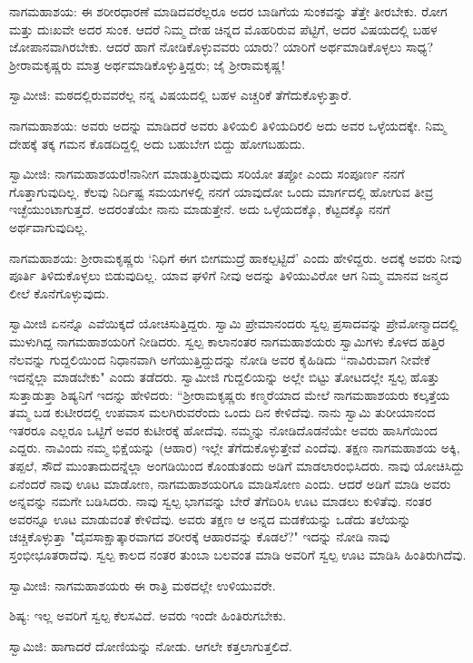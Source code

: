 ನಾಗಮಹಾಶಯ: ಈ ಶರೀರಧಾರಣೆ ಮಾಡಿದವರೆಲ್ಲರೂ ಅದರ ಬಾಡಿಗೆಯ ಸುಂಕವನ್ನು ತೆತ್ತೇ ತೀರಬೇಕು. ರೋಗ ಮತ್ತು ದುಃಖವೇ ಅದರ ಸುಂಕ. ಆದರೆ ನಿಮ್ಮ ದೇಹ ಚಿನ್ನದ ಮೊಹರಿರುವ ಪೆಟ್ಟಿಗೆ, ಅದರ ವಿಷಯದಲ್ಲಿ ಬಹಳ ಜೋಪಾನವಾಗಿರಬೇಕು. ಆದರೆ ಹಾಗೆ ನೋಡಿಕೊಳ್ಳುವವರು ಯಾರು? ಯಾರಿಗೆ ಅರ್ಥಮಾಡಿಕೊಳ್ಳಲು ಸಾಧ್ಯ? ಶ‍್ರೀರಾಮಕೃಷ್ಣರು ಮಾತ್ರ ಅರ್ಥಮಾಡಿಕೊಳ್ಳುತ್ತಿದ್ದರು; ಜೈ ಶ‍್ರೀರಾಮಕೃಷ್ಣ!

ಸ್ವಾಮೀಜಿ: ಮಠದಲ್ಲಿರುವವರೆಲ್ಲ ನನ್ನ ವಿಷಯದಲ್ಲಿ ಬಹಳ ಎಚ್ಚರಿಕೆ ತೆಗೆದುಕೊಳ್ಳುತ್ತಾರೆ.

ನಾಗಮಹಾಶಯ: ಅವರು ಅದನ್ನು ಮಾಡಿದರೆ ಅವರು ತಿಳಿಯಲಿ ತಿಳಿಯದಿರಲಿ ಅದು ಅವರ ಒಳ್ಳೆಯದಕ್ಕೇ. ನಿಮ್ಮ ದೇಹಕ್ಕೆ ತಕ್ಕ ಗಮನ ಕೊಡದಿದ್ದಲ್ಲಿ ಅದು ಬಹುಬೇಗ ಬಿದ್ದು ಹೋಗಬಹುದು.

ಸ್ವಾಮೀಜಿ: ನಾಗಮಹಾಶಯರೆ!ನಾನೀಗ ಮಾಡುತ್ತಿರುವುದು ಸರಿಯೋ ತಪ್ಪೋ ಎಂದು ಸಂಪೂರ್ಣ ನನಗೆ ಗೊತ್ತಾಗುವುದಿಲ್ಲ. ಕೆಲವು ನಿರ್ದಿಷ್ಟ ಸಮಯಗಳಲ್ಲಿ ನನಗೆ ಯಾವುದೋ ಒಂದು ಮಾರ್ಗದಲ್ಲಿ ಹೋಗುವ ತೀವ್ರ ಇಚ್ಛೆಯುಂಟಾಗುತ್ತದೆ. ಅದರಂತೆಯೇ ನಾನು ಮಾಡುತ್ತೇನೆ. ಅದು ಒಳ್ಳೆಯದಕ್ಕೊ, ಕೆಟ್ಟದಕ್ಕೊ ನನಗೆ ಅರ್ಥವಾಗುವುದಿಲ್ಲ.

ನಾಗಮಹಾಶಯ: ಶ‍್ರೀರಾಮಕೃಷ್ಣರು ‘ನಿಧಿಗೆ ಈಗ ಬೀಗಮುದ್ರೆ ಹಾಕಲ್ಪಟ್ಟಿದೆ’ ಎಂದು ಹೇಳಿದ್ದರು. ಅದಕ್ಕೆ ಅವರು ನೀವು ಪೂರ್ತಿ ತಿಳಿದುಕೊಳ್ಳಲು ಬಿಡುವುದಿಲ್ಲ. ಯಾವ ಘಳಿಗೆ ನೀವು ಅದನ್ನು ತಿಳಿಯುವಿರೋ ಆಗ ನಿಮ್ಮ ಮಾನವ ಜನ್ಮದ ಲೀಲೆ ಕೊನೆಗೊಳ್ಳುವುದು.

ಸ್ವಾಮೀಜಿ ಏನನ್ನೊ ಎವೆಯಿಕ್ಕದೆ ಯೋಚಿಸುತ್ತಿದ್ದರು. ಸ್ವಾಮಿ ಪ್ರೇಮಾನಂದರು ಸ್ವಲ್ಪ ಪ್ರಸಾದವನ್ನು ಪ್ರೇಮೋನ್ಮಾದದಲ್ಲಿ ಮುಳುಗಿದ್ದ ನಾಗಮಹಾಶಯರಿಗೆ ನೀಡಿದರು. ಸ್ವಲ್ಪ ಕಾಲಾನಂತರ ನಾಗಮಹಾಶಯರು ಸ್ವಾಮಿಗಳು ಕೊಳದ ಹತ್ತಿರ ನೆಲವನ್ನು ಗುದ್ದಲಿಯಿಂದ ನಿಧಾನವಾಗಿ ಅಗೆಯುತ್ತಿದ್ದುದನ್ನು ನೋಡಿ ಅವರ ಕೈಹಿಡಿದು “ನಾವಿರುವಾಗ ನೀವೇಕೆ ಇದನ್ನೆಲ್ಲಾ ಮಾಡಬೇಕು" ಎಂದು ತಡೆದರು. ಸ್ವಾಮೀಜಿ ಗುದ್ದಲಿಯನ್ನು ಅಲ್ಲೇ ಬಿಟ್ಟು ತೋಟದಲ್ಲೇ ಸ್ವಲ್ಪ ಹೊತ್ತು ಸುತ್ತಾಡುತ್ತಾ ಶಿಷ್ಯನಿಗೆ ಇದನ್ನು ಹೇಳಿದರು: “ಶ‍್ರೀರಾಮಕೃಷ್ಣರು ಕಣ್ಮರೆಯಾದ ಮೇಲೆ ನಾಗಮಹಾಶಯರು ಕಲ್ಕತ್ತೆಯ ತಮ್ಮ ಬಡ ಕುಟೀರದಲ್ಲಿ ಉಪವಾಸ ಮಲಗಿರುವರೆಂದು ಒಂದು ದಿನ ಕೇಳಿದೆವು. ನಾನು ಸ್ವಾಮಿ ತುರೀಯಾನಂದ ಇತರರೂ ಎಲ್ಲರೂ ಒಟ್ಟಿಗೆ ಅವರ ಕುಟೀರಕ್ಕೆ ಹೋದೆವು. ನಮ್ಮನ್ನು ನೋಡಿದೊಡನೆಯೇ ಅವರು ಹಾಸಿಗೆಯಿಂದ ಎದ್ದರು. ನಾವಿಂದು ನಮ್ಮ ಭಿಕ್ಷೆಯನ್ನು (ಆಹಾರ) ಇಲ್ಲೇ ತೆಗೆದುಕೊಳ್ಳುತ್ತೇವೆ ಎಂದೆವು. ತಕ್ಷಣ ನಾಗಮಹಾಶಯ ಅಕ್ಕಿ, ತಪ್ಪಲೆ, ಸೌದೆ ಮುಂತಾದುದನ್ನೆಲ್ಲಾ ಅಂಗಡಿಯಿಂದ ಕೊಂಡುತಂದು ಅಡಿಗೆ ಮಾಡಲಾರಂಭಿಸಿದರು. ನಾವು ಯೋಚಿಸಿದ್ದು ಏನೆಂದರೆ ನಾವು ಊಟ ಮಾಡೋಣ, ನಾಗಮಹಾಶಯರಿಗೂ ಮಾಡಿಸೋಣ ಎಂದು. ಆದರೆ ಅಡಿಗೆ ಮಾಡಿ ಅವರು ಅನ್ನವನ್ನು ನಮಗೇ ಬಡಿಸಿದರು. ನಾವು ಸ್ವಲ್ಪ ಭಾಗವನ್ನು ಬೇರೆ ತೆಗೆದಿರಿಸಿ ಊಟ ಮಾಡಲು ಕುಳಿತೆವು. ನಂತರ ಅವರನ್ನೂ ಊಟ ಮಾಡುವಂತೆ ಕೇಳಿದೆವು. ಅವರು ತಕ್ಷಣ ಆ ಅನ್ನದ ಮಡಕೆಯನ್ನು ಒಡೆದು ತಲೆಯನ್ನು ಚಚ್ಚಿಕೊಳ್ಳುತ್ತಾ "ದೈವಸಾಕ್ಷಾತ್ಕಾರವಾಗದ ಶರೀರಕ್ಕೆ ಆಹಾರವನ್ನು ಕೊಡಲೆ?" ಇದನ್ನು ನೋಡಿ ನಾವು ಸ್ತಂಭೀಭೂತರಾದೆವು. ಸ್ವಲ್ಪ ಕಾಲದ ನಂತರ ತುಂಬಾ ಬಲವಂತ ಮಾಡಿ ಅವರಿಗೆ ಸ್ವಲ್ಪ ಊಟ ಮಾಡಿಸಿ ಹಿಂತಿರುಗಿದೆವು.

ಸ್ವಾಮೀಜಿ: ನಾಗಮಹಾಶಯರು ಈ ರಾತ್ರಿ ಮಠದಲ್ಲೇ ಉಳಿಯುವರೇ.

ಶಿಷ್ಯ: ಇಲ್ಲ ಅವರಿಗೆ ಸ್ವಲ್ಪ ಕೆಲಸವಿದೆ. ಅವರು ಇಂದೇ ಹಿಂತಿರುಗಬೇಕು.

ಸ್ವಾಮಿಜಿ: ಹಾಗಾದರೆ ದೋಣಿಯನ್ನು ನೋಡು. ಆಗಲೇ ಕತ್ತಲಾಗುತ್ತಲಿದೆ.


